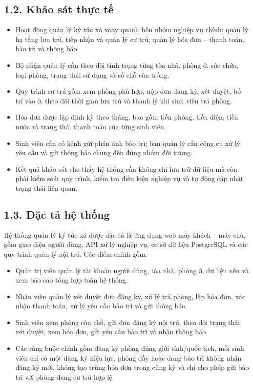 \documentclass[13pt,a4paper]{extarticle}
\begin{document}
	\subsection*{1.2. Khảo sát thực tế}
	\begin{itemize}
		\item Hoạt động quản lý ký túc xá xoay quanh bốn nhóm nghiệp vụ chính: quản lý hạ tầng lưu trú, tiếp nhận và quản lý cư trú, quản lý hóa đơn -- thanh toán, bảo trì và thông báo.
		\item Bộ phận quản lý cần theo dõi tình trạng từng tòa nhà, phòng ở, sức chứa, loại phòng, trạng thái sử dụng và số chỗ còn trống.
		\item Quy trình cư trú gồm xem phòng phù hợp, nộp đơn đăng ký, xét duyệt, bố trí vào ở, theo dõi thời gian lưu trú và thanh lý khi sinh viên trả phòng.
		\item Hóa đơn được lập định kỳ theo tháng, bao gồm tiền phòng, tiền điện, tiền nước và trạng thái thanh toán của từng sinh viên.
		\item Sinh viên cần có kênh gửi phản ánh bảo trì; ban quản lý cần công cụ xử lý yêu cầu và gửi thông báo chung đến đúng nhóm đối tượng.
		\item Kết quả khảo sát cho thấy hệ thống cần không chỉ lưu trữ dữ liệu mà còn phải kiểm soát quy trình, kiểm tra điều kiện nghiệp vụ và tự động cập nhật trạng thái liên quan.
	\end{itemize}
	
	\subsection*{1.3. Đặc tả hệ thống}
	Hệ thống quản lý ký túc xá được đặc tả là ứng dụng web máy khách -- máy chủ, gồm giao diện người dùng, API xử lý nghiệp vụ, cơ sở dữ liệu PostgreSQL và các quy trình quản lý nội trú. Các điểm chính gồm:
	\begin{itemize}
		\item Quản trị viên quản lý tài khoản người dùng, tòa nhà, phòng ở, dữ liệu nền và xem báo cáo tổng hợp toàn hệ thống.
		\item Nhân viên quản lý xét duyệt đơn đăng ký, xử lý trả phòng, lập hóa đơn, xác nhận thanh toán, xử lý yêu cầu bảo trì và gửi thông báo.
		\item Sinh viên xem phòng còn chỗ, gửi đơn đăng ký nội trú, theo dõi trạng thái xét duyệt, xem hóa đơn, gửi yêu cầu bảo trì và nhận thông báo.
		\item Các ràng buộc chính gồm đăng ký phòng đúng giới tính/quốc tịch, mỗi sinh viên chỉ có một đăng ký hiệu lực, phòng đầy hoặc đang bảo trì không nhận đăng ký mới, không tạo trùng hóa đơn trong cùng kỳ và chỉ cho phép gửi bảo trì với phòng đang cư trú hợp lệ.
	\end{itemize}
	
\end{document}
